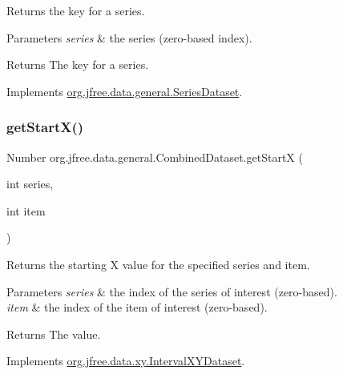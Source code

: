 Returns the key for a series.


\begin{DoxyParams}{Parameters}
{\em series} & the series (zero-\/based index).\\
\hline
\end{DoxyParams}
\begin{DoxyReturn}{Returns}
The key for a series. 
\end{DoxyReturn}


Implements \mbox{\hyperlink{interfaceorg_1_1jfree_1_1data_1_1general_1_1_series_dataset_a60488892b2314a05a012999e26a74178}{org.\+jfree.\+data.\+general.\+Series\+Dataset}}.

\mbox{\label{classorg_1_1jfree_1_1data_1_1general_1_1_combined_dataset_ac4979232d9b53df764eb427259e2b104}} 
\subsubsection{\texorpdfstring{get\+Start\+X()}{getStartX()}}
{\footnotesize\ttfamily Number org.\+jfree.\+data.\+general.\+Combined\+Dataset.\+get\+StartX (\begin{DoxyParamCaption}\item[{int}]{series,  }\item[{int}]{item }\end{DoxyParamCaption})}

Returns the starting X value for the specified series and item.


\begin{DoxyParams}{Parameters}
{\em series} & the index of the series of interest (zero-\/based). \\
\hline
{\em item} & the index of the item of interest (zero-\/based).\\
\hline
\end{DoxyParams}
\begin{DoxyReturn}{Returns}
The value. 
\end{DoxyReturn}


Implements \mbox{\hyperlink{interfaceorg_1_1jfree_1_1data_1_1xy_1_1_interval_x_y_dataset_a7548ec7d60d72463313dc6f10aceee62}{org.\+jfree.\+data.\+xy.\+Interval\+X\+Y\+Dataset}}.

